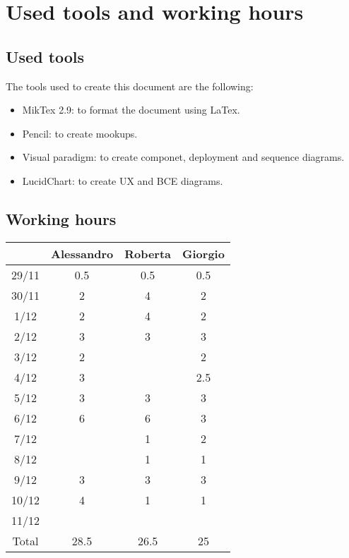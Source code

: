 \chapter{Used tools and working hours}

\section{Used tools}

The tools used to create this document are the following:
\begin{itemize}
\item MikTex 2.9: to format the document using LaTex.
\item Pencil: to create mookups.
\item Visual paradigm: to create componet, deployment and sequence diagrams.
\item LucidChart: to create UX and BCE diagrams.
\end{itemize}

\clearpage
\section{Working hours}

\begin{table}[!h]
\begin{tabular}{c|c|c|c}
\centering
      & Alessandro & Roberta & Giorgio \\ \hline
29/11 & 0.5    & 0.5  & 0.5     \\ \hline
30/11 & 2    & 4    & 2  \\ \hline
1/12  & 2  & 4    &  2  \\ \hline
2/12  & 3  & 3    &  3  \\ \hline
3/12  & 2    &      &  2   \\ \hline
4/12  & 3    &      &   2.5   \\ \hline
5/12  & 3     & 3    & 3  \\ \hline
6/12  & 6    & 6    &   3   \\ \hline
7/12  &   & 1    &   2  \\ \hline
8/12  &     & 1    &  1  \\ \hline
9/12  & 3  & 3    &  3 \\ \hline
10/12 & 4  & 1    &   1   \\ \hline
11/12 &     &      &    \\ \hline
Total & 28.5   & 26.5 & 25
\end{tabular}
\end{table}